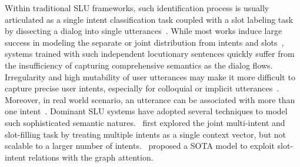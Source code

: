 \documentclass[a4paper]{article}
\begin{document}
Within traditional SLU frameworks, such identification process is usually articulated as a single intent classification task coupled with a slot labeling task by dissecting a dialog into single utterances~\cite{liu2017, xia-etal-2018-zero}.
While most works induce large success in modeling the separate or joint distribution from intents and slots~\cite{goo-etal-2018-slot, li-etal-2018-self, e-etal-2019-novel, liu2019cmnet}, systems trained with such independent locutionary sentences quickly suffer from the insufficiency of capturing comprehensive semantics as the dialog flows. Irregularity and high mutability of user utterances may make it more difficult to capture precise user intents, especially for colloquial or implicit utterances~\cite{purohitshort}.
Moreover, in real world scenario, an utterance can be associated with more than one intent~\cite{goo-etal-2018-slot, qin2019stackpropagation, qin2020agif, Rash:19}. Dominant SLU systems have adopted several techniques to model such sophisticated semantic natures.~\cite{Rash:19} first explored the joint multi-intent and slot-filling task by treating multiple intents as a single context vector, but not scalable to a larger number of intents.~\cite{qin2020agif} proposed a SOTA model to exploit slot-intent relations with the graph attention.
\end{document}
